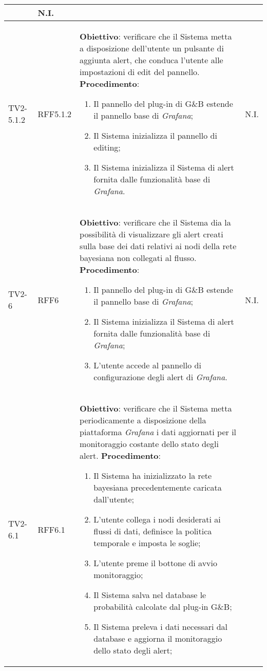 \begin{longtable}{|C{.15\textwidth}|C{.13\textwidth}|m{.52\textwidth}|C{.08\textwidth}|}
	& N.I. \\
\hline
{} TV2-5.1.2 & RFF5.1.2 &
	\textbf{Obiettivo}: verificare che il Sistema metta a disposizione dell'utente un pulsante di aggiunta alert, che conduca l'utente alle impostazioni di edit del pannello. \newline
	\textbf{Procedimento}:
	\begin{enumerate}
		\item Il pannello del plug-in di G\&B estende il pannello base di \textit{Grafana};
		\item Il Sistema inizializza il pannello di editing;
		\item Il Sistema inizializza il Sistema di alert fornita dalle funzionalità base di \textit{Grafana}.
	\end{enumerate}
	& N.I. \\
\hline
TV2-6 & RFF6 &
	\textbf{Obiettivo}: verificare che il Sistema dia la possibilità di visualizzare gli alert creati sulla base dei dati relativi ai nodi della rete bayesiana non collegati al flusso. \newline
	\textbf{Procedimento}:
	\begin{enumerate}
		\item Il pannello del plug-in di G\&B estende il pannello base di \textit{Grafana};
		\item Il Sistema inizializza il Sistema di alert fornita dalle funzionalità base di \textit{Grafana};
		\item L'utente accede al pannello di configurazione degli alert di \textit{Grafana}.
	\end{enumerate}
	& N.I. \\
\hline
{} TV2-6.1 & RFF6.1 &
	\textbf{Obiettivo}: verificare che il Sistema metta periodicamente a disposizione della piattaforma \textit{Grafana} i dati aggiornati per il monitoraggio costante dello stato degli alert. \newline
	\textbf{Procedimento}:
	\begin{enumerate}
		\item Il Sistema ha inizializzato la rete bayesiana precedentemente caricata dall'utente;
		\item L'utente collega i nodi desiderati ai flussi di dati, definisce la politica temporale e imposta le soglie;
		\item L'utente preme il bottone di avvio monitoraggio;
		\item Il Sistema salva nel database le probabilità calcolate dal plug-in G\&B;
		\item Il Sistema preleva i dati necessari dal database e aggiorna il monitoraggio dello stato degli alert;

\end{enumerate}
\end{longtable}
